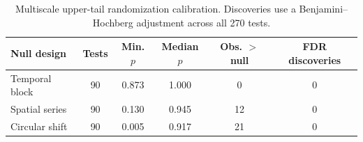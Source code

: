 \begin{table}[!htbp]
\caption{Multiscale upper-tail randomization calibration. Discoveries use a Benjamini--Hochberg adjustment across all 270 tests.}
\label{tab:e16_randomization_summary}
\centering
\begin{tabular*}{\textwidth}{@{\extracolsep{\fill}}lccccc@{}}
\toprule
\textbf{Null design} & \textbf{Tests} & \textbf{Min. $p$} & \textbf{Median $p$} & \textbf{Obs. $>$ null} & \textbf{FDR discoveries}\\
\midrule
Temporal block & 90 & 0.873 & 1.000 & 0 & 0\\
Spatial series & 90 & 0.130 & 0.945 & 12 & 0\\
Circular shift & 90 & 0.005 & 0.917 & 21 & 0\\
\bottomrule
\end{tabular*}
\end{table}
